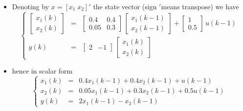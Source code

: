 \begin{frame}
\myPause
 \begin{itemize}[<+-| alert@+>]
 \item Denoting by $x=[x_1\;x_2]'$ the state vector (sign $'$means transpose) we have
       \begin{displaymath}
        \left\{\begin{array}{rcl}
         \begin{bmatrix} x_1(k) \\ x_2(k) \end{bmatrix} 
         &=&             
         \begin{bmatrix} 0.4 & 0.4 \\ 0.05 & 0.3 \end{bmatrix}\,
         \begin{bmatrix} x_1(k-1) \\ x_2(k-1) \end{bmatrix}
         +
         \begin{bmatrix} 1 \\ 0.5 \end{bmatrix}\,
         u(k-1) \\
         y(k)
         &=&          
         \begin{bmatrix} 2 & -1 \end{bmatrix} \,
         \begin{bmatrix} x_1(k) \\ x_2(k) \end{bmatrix}
        \end{array}\right.
       \end{displaymath}
 \item hence in scalar form
       \begin{displaymath}
        \left\{\begin{array}{rcl}
         x_1(k) &=&  0.4 x_1(k-1) + 0.4 x_2(k-1) +    u(k-1)\\
         x_2(k) &=& 0.05 x_1(k-1) + 0.3 x_2(k-1) + 0.5u(k-1)\\
         y(k)   &=&    2 x_1(k-1) -     x_2(k-1)
        \end{array}\right.
       \end{displaymath}
 \end{itemize}
\end{frame}

